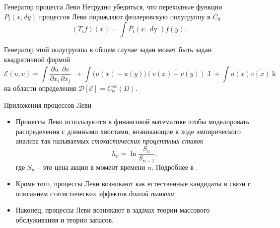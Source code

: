 \documentclass[8pt]{beamer}
\begin{document}
\begin{frame}{Генератор процесса Леви}
  Нетрудно убедиться, что переходные функции \( P_t (x, dy) \)
  процессов Леви порождают феллеровскую полугруппу в \( C_0
  \)
  \[
  ( T_t f ) ( x )
  = \int P_t ( x, \mathop{d y} ) f ( y ).
  \]

  Генератор этой полугруппы в общем случае задан может быть
  задан квадратичной формой
  \[
    \mathcal{E} ( u, v )
    = \int \frac{\partial u}{\partial x_i}
    \overline{\frac{\partial v}{\partial x_j}}
    \mathop{\mu_{i j} ( dx )}
    + \int \Big( u(x) - u(y) \Big)
    \overline{\left( v(x) - v(y) \right)}
    \mathop{J(dx dy)}
    + \int u(x) \overline{v(x)}
    \mathop{k(dx)}
  \]
  на области определения \( \mathcal{D}[\mathcal{E}] =
  C_0^\infty(D) \).

\end{frame}

\begin{frame}{Приложения процессов Леви}
  \begin{itemize}
    \item Процессы Леви используются в финансовой математике чтобы
    моделировать распределения с длинными хвостами, возникающие
    в ходе эмпирического анализа так называемых
    \textit{стохастических процентных ставок}
    \[
      h_n = \ln \frac{S_n}{S_{n - 1}},
    \]
    где \( S_n \) -- это цена акции в момент времени \( n
    \). Подробнее в \cite{schiryaev-finance1}.
    \item Кроме того, процессы Леви возникают как естественные
      кандидаты в связи с описанием статистических эффектов
      \textit{долгой памяти}.
    \item Наконец, процессы Леви возникают в задачах теории
      массового обслуживания и теории запасов.
  \end{itemize}
\end{frame}



\end{document}
